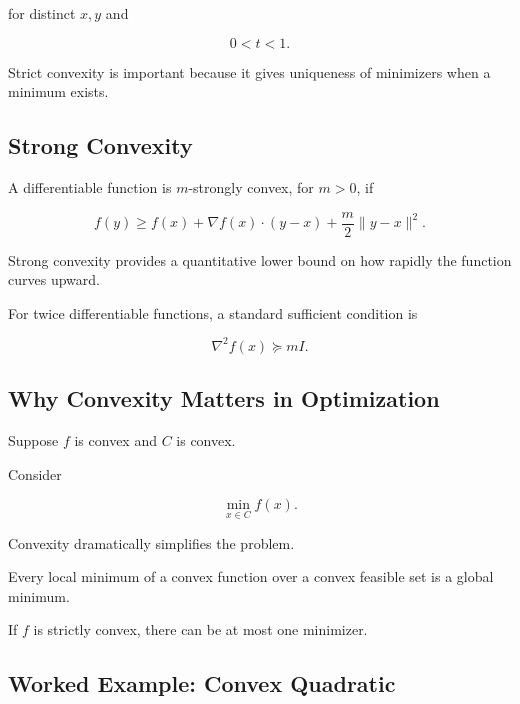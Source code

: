 for distinct \(x,y\) and

\[
0<t<1.
\]

Strict convexity is important because it gives uniqueness of minimizers when
a minimum exists.

\subsection{Strong Convexity}
\label{subsec:strong-convexity}

A differentiable function is \(m\)-strongly convex, for \(m>0\), if

\[
\boxed{
f(y)
\geq
f(x)
+
\nabla f(x)\cdot(y-x)
+
\frac{m}{2}\|y-x\|^2.
}
\]

Strong convexity provides a quantitative lower bound on how rapidly the
function curves upward.

For twice differentiable functions, a standard sufficient condition is

\[
\boxed{
\nabla^2f(x)\succeq mI.
}
\]

\subsection{Why Convexity Matters in Optimization}
\label{subsec:convexity-optimization}

Suppose \(f\) is convex and \(C\) is convex.

Consider

\[
\boxed{
\min_{x\in C}f(x).
}
\]

Convexity dramatically simplifies the problem.

\begin{theorem}
Every local minimum of a convex function over a convex feasible set is a
global minimum.
\end{theorem}

If \(f\) is strictly convex, there can be at most one minimizer.

\subsection{Worked Example: Convex Quadratic}
\label{subsec:worked-convex-quadratic}

